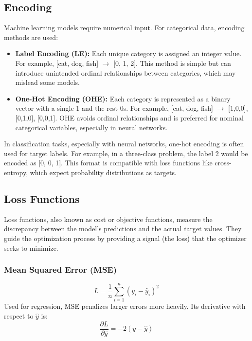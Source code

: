\documentclass[a4paper, journal]{IEEEtran}
\begin{document}
\subsection{Encoding}
Machine learning models require numerical input. For categorical data, encoding methods are used:
\begin{itemize}
    \item \textbf{Label Encoding (LE):} Each unique category is assigned an integer value. For example, [cat, dog, fish] $\rightarrow$ [0, 1, 2]. This method is simple but can introduce unintended ordinal relationships between categories, which may mislead some models.
    \item \textbf{One-Hot Encoding (OHE):} Each category is represented as a binary vector with a single 1 and the rest 0s. For example, [cat, dog, fish] $\rightarrow$ [1,0,0], [0,1,0], [0,0,1]. OHE avoids ordinal relationships and is preferred for nominal categorical variables, especially in neural networks.
\end{itemize}

In classification tasks, especially with neural networks, one-hot encoding is often used for target labels. For example, in a three-class problem, the label 2 would be encoded as [0, 0, 1]. This format is compatible with loss functions like cross-entropy, which expect probability distributions as targets.

\subsection{Loss Functions}
Loss functions, also known as cost or objective functions, measure the discrepancy between the model's predictions and the actual target values. They guide the optimization process by providing a signal (the loss) that the optimizer seeks to minimize.

\subsubsection{Mean Squared Error (MSE)}
\begin{equation}
    L = \frac{1}{n}\sum_{i=1}^n (y_i - \hat{y}_i)^2
\end{equation}
Used for regression, MSE penalizes larger errors more heavily. Its derivative with respect to \(\hat{y}\) is:
\begin{equation}
    \frac{\partial L}{\partial \hat{y}} = -2(y - \hat{y})
\end{equation}
\end{document}
